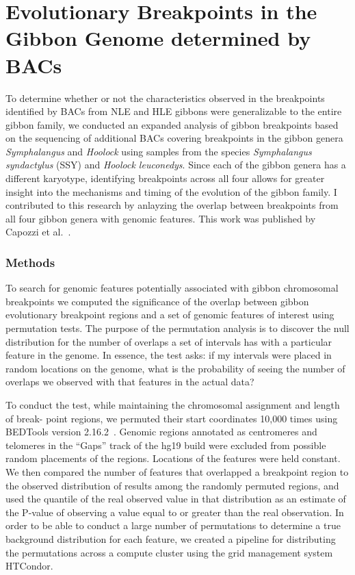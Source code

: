\section{Evolutionary Breakpoints in the Gibbon Genome determined by BACs}

To determine whether or not the characteristics observed in the breakpoints identified by BACs from NLE and HLE gibbons were generalizable to the entire gibbon family, we conducted an expanded analysis of gibbon breakpoints based on the sequencing of additional BACs covering breakpoints in the gibbon genera \emph{Symphalangus} and \emph{Hoolock} using samples from the species \emph{Symphalangus syndactylus} (SSY) and \emph{Hoolock leuconedys}. Since each of the gibbon genera has a different karyotype, identifying breakpoints across all four allows for greater insight into the mechanisms and timing of the evolution of the gibbon family. I contributed to this research by anlayzing the overlap between breakpoints from all four gibbon genera with genomic features. This work was published by Capozzi et al.~\cite{Capozzi:2012bb}.

\subsubsection{Methods}

To search for genomic features potentially associated with gibbon chromosomal breakpoints we computed the significance of the overlap between gibbon evolutionary breakpoint regions and a set of genomic features of interest using permutation tests. The purpose of the permutation analysis is to discover the null distribution for the number of overlaps a set of intervals has with a particular feature in the genome. In essence, the test asks: if my intervals were placed in random locations on the genome, what is the probability of seeing the number of overlaps we observed with that features in the actual data? 

To conduct the test, while maintaining the chromosomal assignment and length of break- point regions, we permuted their start coordinates 10,000 times using BEDTools version 2.16.2~\cite{Quinlan:2010km}. Genomic regions annotated as centromeres and telomeres in the ``Gaps'' track of the hg19 build were excluded from possible random placements of the regions. Locations of the features were held constant. We then compared the number of features that overlapped a breakpoint region to the observed distribution of results among the randomly permuted regions, and used the quantile of the real observed value in that distribution as an estimate of the P-value of observing a value equal to or greater than the real observation. In order to be able to conduct a large number of permutations to determine a true background distribution for each feature, we created a pipeline for distributing the permutations across a compute cluster using the grid management system HTCondor.

